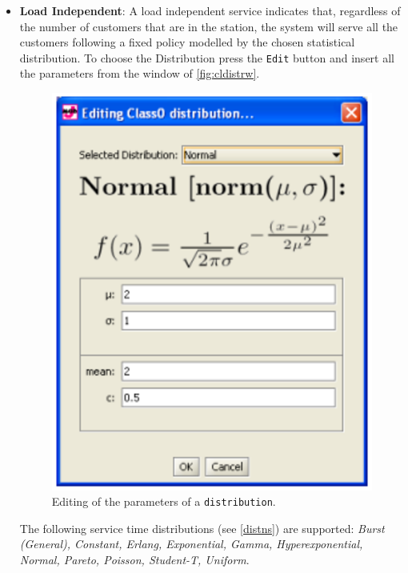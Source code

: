 \begin{itemize}
\item \textbf{Load Independent}: A load independent service
indicates that, regardless of the number of customers that are in
the station, the system will serve all the customers following a
fixed policy modelled by the chosen statistical distribution. To
choose the Distribution press the \texttt{Edit} button and insert
all the parameters from the window of \autoref{fig:cldistrw}.
\begin{figure}[htb]
    \begin{center}
        \includegraphics[scale=.5]{img/jsimg/8.17.eps}
    \end{center}
    \caption{Editing of the parameters of a \texttt{distribution}.}
    \label{fig:cldistrw}
\end{figure}

The following service time distributions (see \autoref{distns})
are supported: \emph{Burst (General), Constant, Erlang,
Exponential, Gamma, Hyperexponential, Normal, Pareto, Poisson,
Student-T, Uniform}.


\end{itemize}
